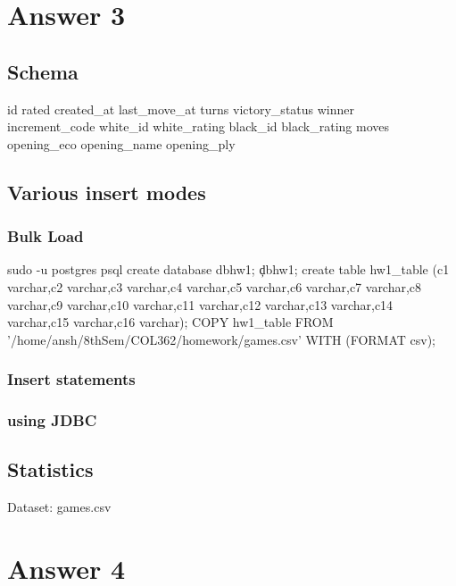 \documentclass[10pt]{article}
\begin{document}
\section{Answer 3}
\subsection{Schema}
id	rated	created\_at	last\_move\_at	turns	victory\_status	winner\\	increment\_code	white\_id	white\_rating	black\_id	black\_rating	moves\\	opening\_eco	opening\_name	opening\_ply

\subsection{Various insert modes}
\subsubsection{Bulk Load}

sudo -u postgres psql
create database dbhw1;
\c dbhw1;
 create table hw1\_table (c1 varchar,c2 varchar,c3 varchar,c4 varchar,c5 varchar,c6 varchar,c7 varchar,c8 varchar,c9 varchar,c10 varchar,c11 varchar,c12 varchar,c13 varchar,c14 varchar,c15 varchar,c16 varchar);
COPY hw1\_table FROM '/home/ansh/8thSem/COL362/homework/games.csv' WITH (FORMAT csv);


\subsubsection{Insert statements}

\subsubsection{using JDBC}
\subsection{Statistics}
Dataset: games.csv 


\section{Answer 4}
\end{document}
